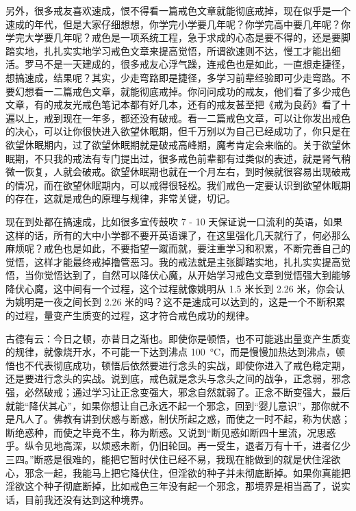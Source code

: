 \documentclass{ctexart}
\begin{document}
另外，很多戒友喜欢速成，恨不得看一篇戒色文章就能彻底戒掉，现在似乎是一个速成的年代，但是大家仔细想想，你学完小学要几年呢？你学完高中要几年呢？你学完大学要几年呢？戒色是一项系统工程，急于求成的心态是要不得的，还是要脚踏实地，扎扎实实地学习戒色文章来提高觉悟，所谓欲速则不达，慢工才能出细活。罗马不是一天建成的，很多戒友心浮气躁，连戒色也是如此，一直想走捷径，想搞速成，结果呢？其实，少走弯路即是捷径，多学习前辈经验即可少走弯路。不要幻想看一二篇戒色文章，就能彻底戒掉。你问问成功的戒友，他们看了多少戒色文章，有的戒友光戒色笔记本都有好几本，还有的戒友甚至把《戒为良药》看了十遍以上，戒到现在一年多，都还没有破戒。看一二篇戒色文章，可以让你发出戒色的决心，可以让你很快进入欲望休眠期，但千万别以为自己已经成功了，你只是在欲望休眠期内，过了欲望休眠期就是破戒高峰期，魔考肯定会来临的。关于欲望休眠期，不只我的戒法有专门提出过，很多戒色前辈都有过类似的表述，就是肾气稍微一恢复，人就会破戒。欲望休眠期也就在一个月左右，到时候就很容易出现破戒的情况，而在欲望休眠期内，可以戒得很轻松。我们戒色一定要认识到欲望休眠期的存在，这就是戒色的原理与规律，非常关键，切记。

现在到处都在搞速成，比如很多宣传鼓吹 7 - 10 天保证说一口流利的英语，如果这样的话，所有的大中小学都不要开英语课了，在这里强化几天就行了，何必那么麻烦呢？戒色也是如此，不要指望一蹴而就，要注重学习和积累，不断完善自己的觉悟，这样才能最终戒掉撸管恶习。我的戒法就是主张脚踏实地，扎扎实实提高觉悟，当你觉悟达到了，自然可以降伏心魔，从开始学习戒色文章到觉悟强大到能够降伏心魔，这中间有一个过程，这个过程就像姚明从 1.5 米长到 2.26 米，你会认为姚明是一夜之间长到 2.26 米的吗？这不是速成可以达到的，这是一个不断积累的过程，量变产生质变的过程，这才符合戒色成功的规律。

古德有云：今日之顿，亦昔日之渐也。即使你是顿悟，也不可能逃出量变产生质变的规律，就像烧开水，不可能一下达到沸点 \SI{100}{\degreeCelsius}，而是慢慢加热达到沸点，顿悟也不代表彻底成功，顿悟后依然要进行念头的实战，即使你进入了戒色稳定期，还是要进行念头的实战。说到底，戒色就是念头与念头之间的战争，正念弱，邪念强，必然破戒；通过学习让正念变强大，邪念自然就弱了。正念不断变强大，最后就能“降伏其心”，如果你想让自己永远不起一个邪念，回到“婴儿意识”，那你就不是凡人了。佛教有讲到伏惑与断惑，制伏所起之惑，而使之一时不起，称为伏惑；断绝惑种，而使之毕竟不生，称为断惑。又说到“断见惑如断四十里流，况思惑乎。纵令见地高深，以烦惑未断，仍旧轮回。再一受生，退者万有十千，进者亿少三四。”断惑是很难的，能把它暂时伏住已经不易，我现在能做到的就是伏住淫欲心，邪念一起，我能马上把它降伏住，但淫欲的种子并未彻底断掉。如果你真能把淫欲这个种子彻底断掉，比如戒色三年没有起一个邪念，那境界是相当高了，说实话，目前我还没有达到这种境界。
\end{document}
